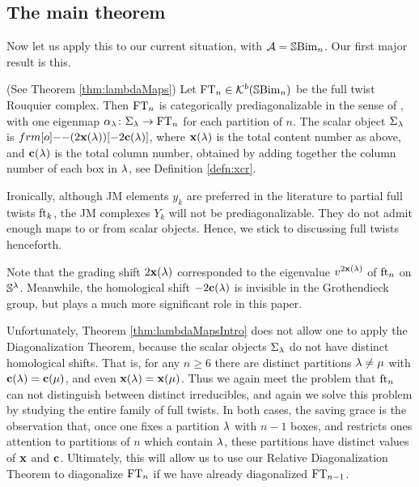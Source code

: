\subsection{The main theorem}

Now let us apply this to our current situation, with ${\mathcal{A}} = {\mathbb{S}}{\rm Bim }_n$. Our first major result is this.

\begin{theorem} \label{thm:lambdaMapsIntro} (See Theorem \ref{thm:lambdaMaps}) Let $\operatorname{FT}_n\in {\mathcal{K}}^b({\mathbb{S}}{\rm Bim }_n)$ be the full twist Rouquier complex. Then $\operatorname{FT}_n$ is categorically
prediagonalizable in the sense of \cite[Definition 6.13]{ElHog17a}, with one eigenmap $\alpha_\lambda \colon \Sigma_\lambda \rightarrow \operatorname{FT}_n$ for each partition of $n$.  The scalar object $\Sigma_\lambda$ is
$\one(2\xbb(\l))[-2\cbb(\l)]$, where $\mathbf{x}(\lambda)$ is the total content number as above, and $\mathbf{c}(\lambda)$ is the total column number, obtained by adding together the column number of each box
in $\lambda$, see Definition \ref{defn:xcr}. \end{theorem}

\begin{remark} Ironically, although JM elements $y_k$ are preferred in the literature to partial full twists $\operatorname{ft}_k$, the JM complexes $Y_k$ will not be prediagonalizable. They do not admit enough maps to or from scalar objects. Hence, we stick to discussing full twists henceforth. \end{remark}

Note that the grading shift $2\mathbf{x}(\lambda)$ corresponded to the eigenvalue $v^{2\mathbf{x}(\lambda)}$ of $\operatorname{ft}_n$ on ${\mathbb{S}}^\lambda$. Meanwhile, the homological shift $-2\mathbf{c}(\lambda)$ is invisible in the
Grothendieck group, but plays a much more significant role in this paper.

Unfortunately, Theorem \ref{thm:lambdaMapsIntro} does not allow one to apply the Diagonalization Theorem, because the scalar objects $\Sigma_\lambda$ do not have distinct homological shifts.
That is, for any $n \ge 6$ there are distinct partitions $\lambda \ne \mu$ with $\mathbf{c}(\lambda) = \mathbf{c}(\mu)$, and even $\mathbf{x}(\lambda) = \mathbf{x}(\mu)$. Thus we again meet the problem that $\operatorname{ft}_n$ can not
distinguish between distinct irreducibles, and again we solve this problem by studying the entire family of full twists. In both cases, the saving grace is the observation that, once one
fixes a partition $\lambda$ with $n-1$ boxes, and restricts ones attention to partitions of $n$ which contain $\lambda$, these partitions have distinct values of $\mathbf{x}$ and $\mathbf{c}$. Ultimately,
this will allow us to use our Relative Diagonalization Theorem \cite[Theorem 8.2]{ElHog17a} to diagonalize $\operatorname{FT}_n$ if we have already diagonalized $\operatorname{FT}_{n-1}$.

